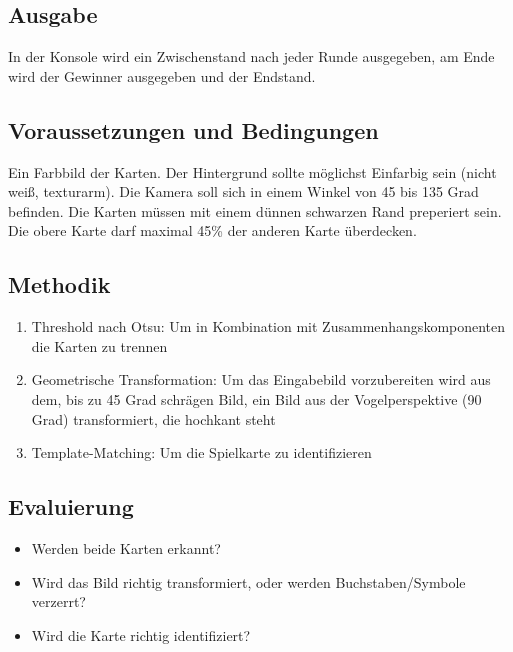 \documentclass[paper=A4, deutsch]{scrartcl}
\begin{document}
\subsection{Ausgabe}
In der Konsole wird ein Zwischenstand nach jeder Runde ausgegeben, am Ende wird der Gewinner ausgegeben und der Endstand.
\subsection{Voraussetzungen und Bedingungen}
Ein Farbbild der Karten. Der Hintergrund sollte möglichst Einfarbig sein (nicht weiß, texturarm). Die Kamera soll sich in einem Winkel von 45 bis 135 Grad befinden. Die Karten müssen mit einem dünnen schwarzen Rand preperiert sein. Die obere Karte darf maximal 45\% der anderen Karte überdecken.
\subsection{Methodik}
\begin{enumerate}
	\item Threshold nach Otsu: Um in Kombination mit Zusammenhangskomponenten die Karten zu trennen
	\item Geometrische Transformation: Um das Eingabebild vorzubereiten wird aus dem, bis zu 45 Grad schrägen Bild, ein Bild aus der Vogelperspektive (90 Grad) transformiert, die hochkant steht
	\item Template-Matching: Um die Spielkarte zu identifizieren 
\end{enumerate}
\subsection{Evaluierung}
\begin{itemize}
	\item Werden beide Karten erkannt?
	\item Wird das Bild richtig transformiert, oder werden Buchstaben/Symbole verzerrt?
	\item Wird die Karte richtig identifiziert?
\end{itemize}
\end{document}
